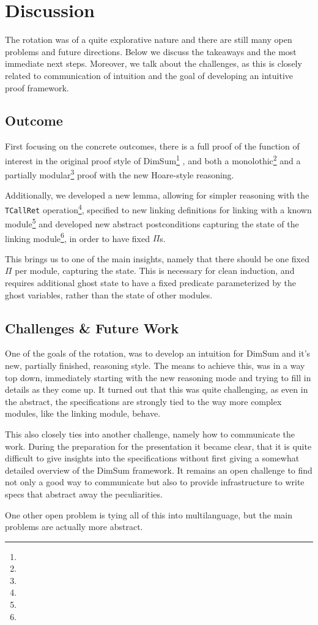 \documentclass[runningheads, orivec]{llncs}
\begin{document}
\section{Discussion}

The rotation was of a quite explorative nature and there are still many open problems and future directions. Below we discuss the takeaways and the most immediate next steps. Moreover, we talk about the challenges, as this is closely related to communication of intuition and the goal of developing an intuitive proof framework.

\subsection{Outcome}

First focusing on the concrete outcomes, there is a full proof of the function of interest in the original proof style of DimSum\footnote{} , and both a monolothic\footnote{} and a partially modular\footnote{} proof with the new Hoare-style reasoning.

Additionally, we developed a new lemma, allowing for simpler reasoning with the \texttt{TCallRet} operation\footnote{}, specified to new linking definitions for linking with a known module\footnote{} and developed new abstract postconditions capturing the state of the linking module\footnote{}, in order to have fixed $\Pi$s.

This brings us to one of the main insights, namely that there should be one fixed $\Pi$ per module, capturing the state. This is necessary for clean induction, and requires additional ghost state to have a fixed predicate parameterized by the ghost variables, rather than the state of other modules.

\subsection{Challenges \& Future Work}

One of the goals of the rotation, was to develop an intuition for DimSum and it's new, partially finished, reasoning style. The means to achieve this, was in a way top down, immediately starting with the new reasoning mode and trying to fill in details as they come up. It turned out that this was quite challenging, as even in the abstract, the specifications are strongly tied to the way more complex modules, like the linking module, behave.

This also closely ties into another challenge, namely how to communicate the work. During the preparation for the presentation it became clear, that it is quite difficult to give insights into the specifications without first giving a somewhat detailed overview of the DimSum framework. It remains an open challenge to find not only a good way to communicate but also to provide infrastructure to write specs that abstract away the peculiarities.

One other open problem is tying all of this into multilanguage, but the main problems are actually more abstract.



\end{document}
